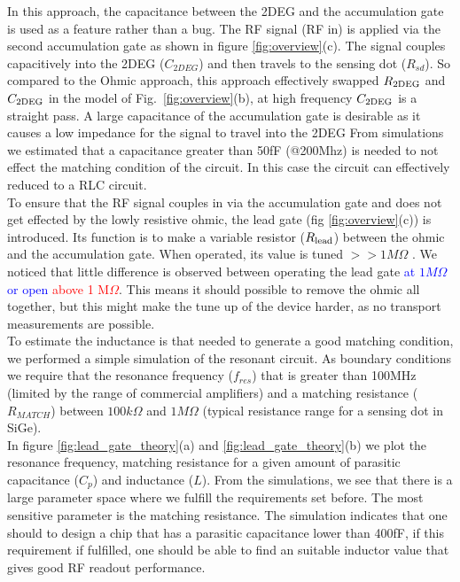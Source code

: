 \documentclass[]{article}
\begin{document}
	
	In this approach, the capacitance between the 2DEG and the accumulation gate is used as a feature rather than a bug.  The RF signal (RF in) is applied via the second accumulation gate as shown in figure \ref{fig:overview}(c).  The signal couples capacitively into the 2DEG ($C_{2DEG}$) and then travels to the sensing dot ($R_{sd}$). So compared to the Ohmic approach, this approach effectively swapped $R_{\rm 2DEG}$ and $C_{\rm 2DEG}$ in the model of Fig.\ \ref{fig:overview}(b), at high frequency $C_{\rm 2DEG}$ is a straight pass. A large capacitance of the accumulation gate is desirable as it causes a low impedance for the signal to travel into the 2DEG From simulations we estimated that a capacitance greater than 50fF (@200Mhz) is needed to not effect the matching condition of the circuit. In this case the circuit can effectively reduced to a RLC circuit.
	\\
	To ensure that the RF signal couples in via the accumulation gate and does not get effected by the lowly resistive ohmic, the lead gate (fig \ref{fig:overview}(c)) is introduced.
	Its function is to make a variable resistor ($R_{\rm lead}$) between the ohmic and the accumulation gate.
	When operated, its value is tuned $>>1M\Omega$ . We noticed that little difference is observed between operating the lead gate \textcolor{blue}{at $1M\Omega$ or open} \textcolor{red}{above 1 M$\Omega$}. This means it should possible to remove the ohmic all together, but this might make the tune up of the device harder, as no transport measurements are possible.
	\\
	To estimate the inductance is that needed to generate a good matching condition, we performed a simple simulation of the resonant circuit. As boundary conditions we require that the resonance frequency ($f_{res}$) that is greater than 100MHz (limited by the range of commercial amplifiers) and a matching resistance ($R_{MATCH}$) between $100k\Omega$ and $1M\Omega$ (typical resistance range for a sensing dot in SiGe).\\
	In figure \ref{fig:lead_gate_theory}(a) and  \ref{fig:lead_gate_theory}(b) we plot the resonance frequency, matching resistance for a given amount of parasitic capacitance ($C_p$) and inductance ($L$).
	From the simulations, we see that there is a large parameter space where we fulfill the requirements set before. The most sensitive parameter is the matching resistance. The simulation indicates that one should to design a chip that has a parasitic capacitance lower than 400fF, if this requirement if fulfilled, one should be able to find an suitable inductor value that gives good RF readout performance.\\
\end{document}
